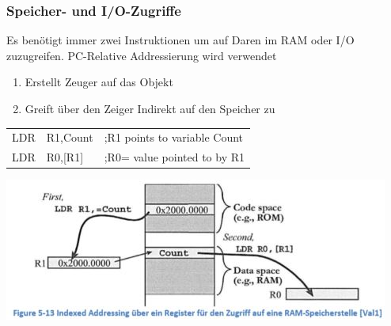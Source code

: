 \subsubsection{Speicher- und I/O-Zugriffe}
\begin{multicols}{2}
    \begin{minipage}{\linewidth}
    Es benötigt immer zwei Instruktionen um auf Daren im RAM oder I/O zuzugreifen.
    \rightarrow PC-Relative Addressierung wird verwendet
    \begin{enumerate}
        \item Erstellt Zeuger auf das Objekt
        \item Greift über den Zeiger Indirekt auf den Speicher zu
    \end{enumerate}
    \begin{tabular}{lll}
        LDR   &R1,Count   &;R1 points to variable Count\\ 
        LDR  &R0,[R1] &;R0= value pointed to by R1\\ 
    \end{tabular} 
\end{minipage}

    \includegraphics[width=\linewidth]{images/AddressingRAM}   
\end{multicols}





















